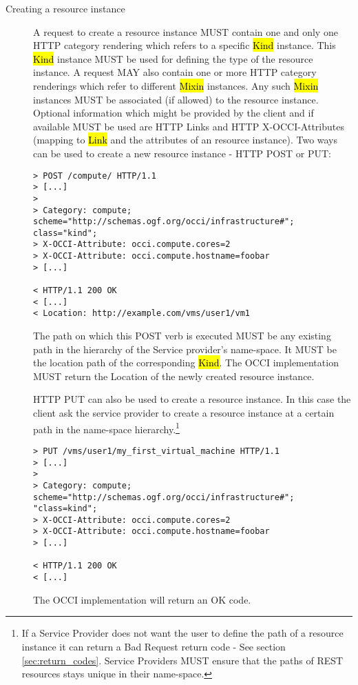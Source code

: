 \documentclass[10pt,a4paper]{article}
\begin{document}
\begin{description}
\item[Creating a resource instance] A request to create a resource
  instance MUST contain one and only one HTTP category rendering which
  refers to a specific \hl{Kind} instance. This \hl{Kind}
  instance MUST be used for defining the type of the resource instance.
  A request MAY also contain one or more HTTP category renderings which refer
  to different \hl{Mixin} instances. Any such \hl{Mixin} instances MUST
  be associated (if allowed) to the resource instance.
  Optional information which might be provided by the client
  and if available MUST be used are HTTP Links and HTTP
  X-OCCI-Attributes (mapping to \hl{Link} and the attributes of an
  resource instance). Two ways can be used to create a new resource
  instance - HTTP POST or PUT:
\begin{verbatim}
> POST /compute/ HTTP/1.1
> [...]
> 
> Category: compute; scheme="http://schemas.ogf.org/occi/infrastructure#"; class="kind"; 
> X-OCCI-Attribute: occi.compute.cores=2
> X-OCCI-Attribute: occi.compute.hostname=foobar
> [...]
 
< HTTP/1.1 200 OK
< [...]
< Location: http://example.com/vms/user1/vm1
\end{verbatim}
  The path on which this POST verb is executed MUST be any existing
  path in the hierarchy of the Service provider's name-space. It MUST
  be the location path of the corresponding \hl{Kind}. The OCCI
  implementation MUST return the Location of the newly created
  resource instance.

  HTTP PUT can also be used to create a resource instance. In this
  case the client ask the service provider to create a resource
  instance at a certain path in the name-space hierarchy.\footnote{If
    a Service Provider does not want the user to define the path of a
    resource instance it can return a Bad Request return code - See
    section \ref{sec:return_codes}. Service Providers MUST ensure that
    the paths of REST resources stays unique in their name-space.}
\begin{verbatim}
> PUT /vms/user1/my_first_virtual_machine HTTP/1.1
> [...]
> 
> Category: compute; scheme="http://schemas.ogf.org/occi/infrastructure#"; "class=kind"; 
> X-OCCI-Attribute: occi.compute.cores=2
> X-OCCI-Attribute: occi.compute.hostname=foobar
> [...]
 
< HTTP/1.1 200 OK
< [...]
\end{verbatim}
  The OCCI implementation will return an OK code.
  

\end{description}
\end{document}
